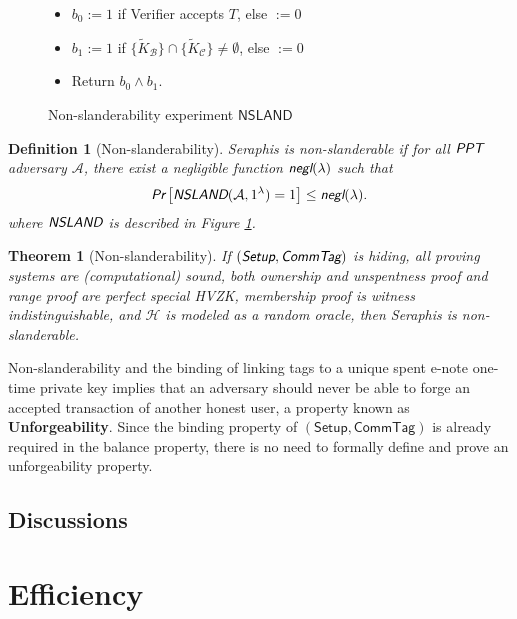 \documentclass{article}
\newtheorem{definition}{Definition}[section]
\newtheorem{theorem}{Theorem}[section]
\begin{document}
\begin{figure}[htbp]
{\begin{minipage}{0.85\textwidth}
\begin{itemize}
\item $b_0:=1$ if Verifier accepts $T$, else $:=0$
\item $b_1:=1$ if $\{\tilde{K}_{\mathcal{B}}\}\cap \{\tilde{K}_{\mathcal{C}}\}\ne\emptyset$, else $:=0$
\item Return $b_0 \wedge b_1$.
\end{itemize}
\end{minipage}}
\caption{Non-slanderability experiment $\textsf{NSLAND}$}
\label{exp-nsland}
\end{figure}

\begin{definition}[Non-slanderability]
Seraphis is non-slanderable if for all $\emph{\textsf{PPT}}$ adversary $\mathcal{A}$, there exist a negligible function $\emph{\textsf{negl}}(\lambda)$ such that
\begin{align*}
\emph{\textsf{Pr}}
\left[
\emph{\textsf{NSLAND}}(\mathcal{A}, 1^{\lambda})=1
\right]
\le \emph{\textsf{negl}}(\lambda).
\end{align*}
where $\emph{\textsf{NSLAND}}$ is described in Figure \ref{exp-nsland}.
\end{definition}
\begin{theorem}[Non-slanderability]
If $(\emph{\textsf{Setup}},\emph{\textsf{CommTag}})$ is hiding, all proving systems are (computational) sound, both ownership and unspentness proof and range proof are perfect special HVZK, membership proof is witness indistinguishable, and $\mathcal{H}$ is modeled as a random oracle, then Seraphis is non-slanderable.  
\end{theorem}
Non-slanderability and the binding of linking tags to a unique spent e-note one-time private key implies that an adversary should never be able to forge an accepted transaction of another honest user, a property known as \textbf{Unforgeability}. Since the binding property of $(\textsf{Setup},\textsf{CommTag})$ is already required in the balance property, there is no need to formally define and prove an unforgeability property.

\subsection{Discussions}\label{sec-disc}

\section{Efficiency}



\end{document}
